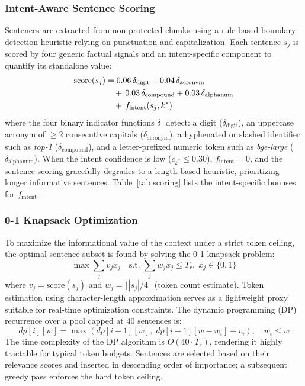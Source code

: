 \documentclass[conference]{IEEEtran}
\begin{document}
\subsubsection{Intent-Aware Sentence Scoring}
Sentences are extracted from non-protected chunks using a
rule-based boundary detection heuristic relying on punctuation and capitalization.
Each sentence $s_j$ is scored by four generic factual signals
and an intent-specific component to quantify its standalone value:
%
\begin{align}
\mathrm{score}(s_j) &=
  0.06\,\delta_{\mathrm{digit}} +
  0.04\,\delta_{\mathrm{acronym}} \notag \\
&\quad +\,0.03\,\delta_{\mathrm{compound}} +
  0.03\,\delta_{\mathrm{alphanum}} \notag \\
&\quad +\,f_{\mathrm{intent}}(s_j, k^*)
\label{eq:sentence}
\end{align}
%
where the four binary indicator functions $\delta_{\cdot}$
detect: a digit ($\delta_{\mathrm{digit}}$), an uppercase
acronym of $\geq$2 consecutive capitals
($\delta_{\mathrm{acronym}}$), a hyphenated or slashed identifier
such as \textit{top-1} ($\delta_{\mathrm{compound}}$), and a
letter-prefixed numeric token such as \textit{bge-large}
($\delta_{\mathrm{alphanum}}$).
When the intent confidence is low ($c_{k^*} \leq 0.30$), $f_{\mathrm{intent}} = 0$, and the sentence scoring gracefully degrades to a length-based heuristic, prioritizing longer informative sentences.
Table~\ref{tab:scoring} lists the intent-specific bonuses
for $f_{\mathrm{intent}}$.

\subsubsection{0-1 Knapsack Optimization}
To maximize the informational value of the context under a strict token ceiling, the optimal sentence subset is found by solving the 0-1 knapsack problem:
%
\begin{equation}
\max\sum_j v_j x_j \quad
\text{s.t.}\;\sum_j w_j x_j \leq T_r,\;
x_j \in \{0,1\}
\label{eq:knapsack}
\end{equation}
%
where $v_j = \mathrm{score}(s_j)$ and
$w_j = \lfloor|s_j|/4\rfloor$ (token count estimate). Token estimation using character-length approximation serves as a lightweight proxy suitable for real-time optimization constraints.
The dynamic programming (DP) recurrence over a pool capped at 40 sentences is:
%
\begin{equation}
dp[i][w] = \max\!\left(dp[i{-}1][w],\;
  dp[i{-}1][w{-}w_i] + v_i\right), \quad w_i \leq w
\label{eq:dp}
\end{equation}
%
The time complexity of the DP algorithm is $O(40 \cdot T_r)$, rendering it highly tractable for typical token budgets. Sentences are selected based on their relevance scores and inserted in descending order of importance; a subsequent greedy pass
enforces the hard token ceiling.
\end{document}
